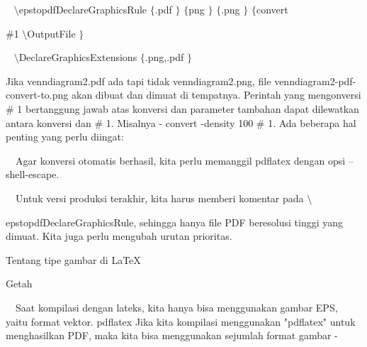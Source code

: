 \vspace{12pt}
\noindent 
~  $  \setminus $epstopdfDeclareGraphicsRule $  \{  $.pdf $  \}  $ $  \{  $png $  \}  $ $  \{  $.png $  \}  $ $  \{  $convert \par
\vspace{12pt}
\noindent 
  $  \#  $1  $  \setminus $OutputFile $  \}  $ \par
\vspace{12pt}
\noindent 
~  $  \setminus $DeclareGraphicsExtensions $  \{  $.png,.pdf $  \}  $ \par
\vspace{16pt}
\vspace{16pt}
\noindent 
 \hspace*{0.5in} Jika venndiagram2.pdf ada tapi tidak venndiagram2.png, file venndiagram2-pdf-convert-to.png akan dibuat dan dimuat di tempatnya. Perintah yang mengonversi  $  \#  $ 1 bertanggung jawab atas konversi dan parameter tambahan dapat dilewatkan antara konversi dan  $  \#  $ 1. Misalnya - convert -density 100  $  \#  $ 1. Ada beberapa hal penting yang perlu diingat: \par
\vspace{12pt}
\noindent 
 $  $ $  $ $  $ $  $Agar konversi otomatis berhasil, kita perlu memanggil pdflatex dengan opsi --shell-escape. \par
\vspace{12pt}
\noindent 
 $  $ $  $ $  $ $  $Untuk versi produksi terakhir, kita harus memberi komentar pada  $  \setminus $  \par
\vspace{12pt}
\noindent 
epstopdfDeclareGraphicsRule, sehingga hanya file PDF beresolusi tinggi yang dimuat. Kita juga perlu mengubah urutan prioritas. \par
\vspace{20pt}
\vspace{20pt}
\vspace{20pt}
\noindent 
Tentang tipe gambar di LaTeX \par
\vspace{12pt}
\noindent 
Getah \par
\vspace{12pt}
\noindent 
 $  $ $  $ $  $ $  $Saat kompilasi dengan lateks, kita hanya bisa menggunakan gambar EPS, yaitu format vektor. pdflatex $  $Jika kita kompilasi menggunakan "pdflatex" untuk menghasilkan PDF, maka kita bisa menggunakan sejumlah format gambar - \par
\vspace{12pt}
\noindent 

